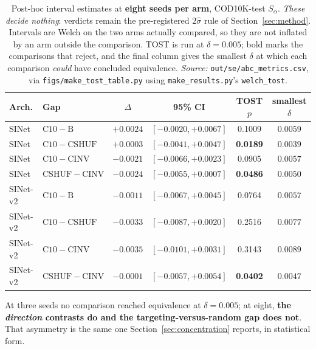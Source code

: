 \begin{table}[t]
\caption{Post-hoc interval estimates at \textbf{eight seeds per arm}, COD10K-test $S_\alpha$.
\emph{These decide nothing}: verdicts remain the pre-registered $2\hat{\sigma}$ rule of
Section~\ref{sec:method}. Intervals are Welch on the two arms actually compared, so they are not
inflated by an arm outside the comparison. TOST is run at $\delta = 0.005$; bold marks the
comparisons that reject, and the final column gives the smallest $\delta$ at which each comparison
\emph{could} have concluded equivalence. \emph{Source:} \texttt{out/se/abc\_metrics.csv}, via
\texttt{figs/make\_tost\_table.py} using \texttt{make\_results.py}'s \texttt{welch\_tost}.}
\label{tab:tost}
\begin{center}
\footnotesize
\setlength{\tabcolsep}{4pt}
\begin{tabular}{@{}llcccc@{}}
\toprule
Arch. & Gap & $\Delta$ & 95\% CI & TOST $p$ & smallest $\delta$ \\
\midrule
SINet & $\mathrm{C10}-\mathrm{B}$ & $+0.0024$ & $[-0.0020, +0.0067]$ & 0.1009 & $0.0059$ \\
SINet & $\mathrm{C10}-\mathrm{CSHUF}$ & $+0.0003$ & $[-0.0041, +0.0047]$ & \textbf{0.0189} & $0.0039$ \\
SINet & $\mathrm{C10}-\mathrm{CINV}$ & $-0.0021$ & $[-0.0066, +0.0023]$ & 0.0905 & $0.0057$ \\
SINet & $\mathrm{CSHUF}-\mathrm{CINV}$ & $-0.0024$ & $[-0.0055, +0.0007]$ & \textbf{0.0486} & $0.0050$ \\
\midrule
SINet-v2 & $\mathrm{C10}-\mathrm{B}$ & $-0.0011$ & $[-0.0067, +0.0045]$ & 0.0764 & $0.0057$ \\
SINet-v2 & $\mathrm{C10}-\mathrm{CSHUF}$ & $-0.0033$ & $[-0.0087, +0.0020]$ & 0.2516 & $0.0077$ \\
SINet-v2 & $\mathrm{C10}-\mathrm{CINV}$ & $-0.0035$ & $[-0.0101, +0.0031]$ & 0.3143 & $0.0089$ \\
SINet-v2 & $\mathrm{CSHUF}-\mathrm{CINV}$ & $-0.0001$ & $[-0.0057, +0.0054]$ & \textbf{0.0402} & $0.0047$ \\
\bottomrule
\end{tabular}
\end{center}
\footnotesize At three seeds no comparison reached equivalence at $\delta = 0.005$; at eight,
\textbf{the \emph{direction} contrasts do and the targeting-versus-random gap does not}. That
asymmetry is the same one Section~\ref{sec:concentration} reports, in statistical form.
\end{table}
